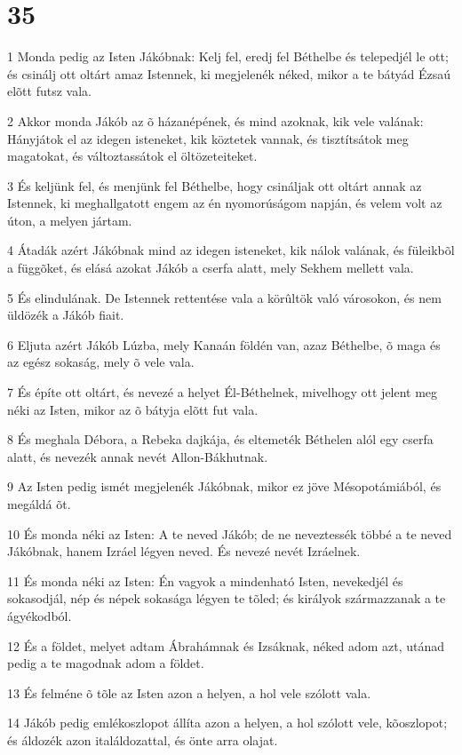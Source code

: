 \chapter{35}

\par 1 Monda pedig az Isten Jákóbnak: Kelj fel, eredj fel Béthelbe és telepedjél le ott; és csinálj ott oltárt amaz Istennek, ki megjelenék néked, mikor a te bátyád Ézsaú elõtt  futsz vala.
\par 2 Akkor monda Jákób az õ házanépének, és mind azoknak, kik vele valának: Hányjátok el az idegen isteneket, kik köztetek vannak, és tisztítsátok meg magatokat, és változtassátok el öltözeteiteket.
\par 3 És keljünk fel, és menjünk fel Béthelbe, hogy csináljak ott oltárt annak az Istennek, ki meghallgatott engem az én nyomorúságom napján, és velem volt az úton, a melyen jártam.
\par 4 Átadák azért Jákóbnak mind az idegen isteneket, kik nálok valának, és füleikbõl a függõket, és elásá azokat Jákób a cserfa alatt, mely Sekhem mellett vala.
\par 5 És elindulának. De Istennek rettentése vala a körûltök való városokon, és nem üldözék a Jákób fiait.
\par 6 Eljuta azért Jákób Lúzba, mely Kanaán földén van, azaz Béthelbe, õ maga és az egész sokaság, mely õ vele vala.
\par 7 És építe ott oltárt, és nevezé a helyet Él-Béthelnek, mivelhogy ott jelent meg néki az Isten, mikor az õ bátyja elõtt fut vala.
\par 8 És meghala Débora, a Rebeka dajkája, és eltemeték Béthelen alól egy cserfa alatt, és nevezék annak nevét Allon-Bákhutnak.
\par 9 Az Isten pedig ismét megjelenék Jákóbnak, mikor ez jöve Mésopotámiából, és megáldá õt.
\par 10 És monda néki az Isten: A te neved Jákób; de ne neveztessék többé a te neved Jákóbnak, hanem Izráel légyen neved. És nevezé nevét Izráelnek.
\par 11 És monda néki az Isten: Én vagyok a mindenható Isten, nevekedjél és sokasodjál, nép és népek sokasága légyen te tõled; és királyok származzanak a te ágyékodból.
\par 12 És a földet, melyet adtam Ábrahámnak és Izsáknak, néked adom azt, utánad pedig a te magodnak adom a földet.
\par 13 És felméne õ tõle az Isten azon a helyen, a hol vele szólott vala.
\par 14 Jákób pedig emlékoszlopot állíta azon a helyen, a hol szólott vele, kõoszlopot; és áldozék azon italáldozattal, és önte arra olajat.
